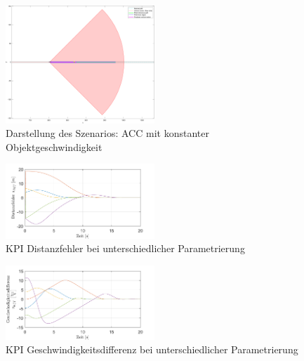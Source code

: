 \begin{figure}
    \centering
    \includegraphics[width=0.5\textwidth]{figures/3_Implementierung/ACC_Vel_Const/test_ACC_Vel_Const_depiction.pdf}
    \caption{Darstellung des Szenarios: ACC mit konstanter Objektgeschwindigkeit}
    \label{fig:test_ACC_Vel_Const_depiction}
\end{figure}


\begin{figure}
    \centering
    \includegraphics[width=0.5\textwidth]{figures/3_Implementierung/ACC_Vel_Const/ACC_Vel_Const_s-Diff.pdf}
    \caption{KPI Distanzfehler bei unterschiedlicher Parametrierung}
    \label{fig:ACC_Vel_Const_s-Diff}
\end{figure}


\begin{figure}
    \centering
    \includegraphics[width=0.5\textwidth]{figures/3_Implementierung/ACC_Vel_Const/ACC_Vel_Const_v-Diff.pdf}
    \caption{KPI Geschwindigkeitsdifferenz bei unterschiedlicher Parametrierung}
    \label{fig:ACC_Vel_Const_v-Diff}
\end{figure}


